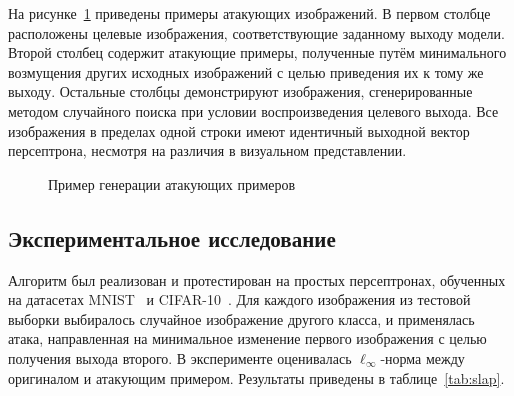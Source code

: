 На рисунке~\cref{fig:bonus_attack} приведены примеры атакующих изображений. В первом столбце расположены целевые изображения, соответствующие заданному выходу модели. Второй столбец содержит атакующие примеры, полученные путём минимального возмущения других исходных изображений с целью приведения их к тому же выходу. Остальные столбцы демонстрируют изображения, сгенерированные методом случайного поиска при условии воспроизведения целевого выхода. Все изображения в пределах одной строки имеют идентичный выходной вектор персептрона, несмотря на различия в визуальном представлении.

\begin{figure}[ht]
    \caption{Пример генерации атакующих примеров}
    \label{fig:bonus_attack}
\end{figure}

\subsection{Экспериментальное исследование}

Алгоритм был реализован и протестирован на простых персептронах, обученных на датасетах MNIST~\cite{deng2012mnist} и CIFAR-10~\cite{krizhevsky2009learning}. Для каждого изображения из тестовой выборки выбиралось случайное изображение другого класса, и применялась атака, направленная на минимальное изменение первого изображения с целью получения выхода второго. В эксперименте оценивалась \(\ell_\infty\)-норма между оригиналом и атакующим примером. Результаты приведены в таблице~\cref{tab:slap}.

